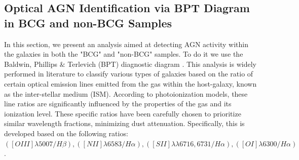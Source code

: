 \subsection{Optical AGN Identification via BPT Diagram in BCG and non-BCG Samples}
In this section, we present an analysis aimed at detecting AGN activity within the galaxies in both the "BCG" and "non-BCG" samples.
To do it we use the Baldwin, Phillips $\&$ Terlevich (BPT) diagnostic diagram \cite{1981PASP...93....5B}.
This analysis is widely performed in literature to classify various types of galaxies based on the ratio of certain optical emission lines emitted from the gas within the host-galaxy, known as the inter-stellar medium (ISM). According to photoionization models, these line ratios are significantly influenced by the properties of the gas and its ionization level.
These specific ratios have been carefully chosen to prioritize similar wavelength fractions, minimizing dust attenuation. Specifically, this is developed based on the following ratios: $([OIII]\lambda 5007/H\beta), ([NII]\lambda 6583/H\alpha), ([SII]\lambda\lambda 6716,6731 / H\alpha), ([OI]\lambda 6300 / H\alpha)$.

